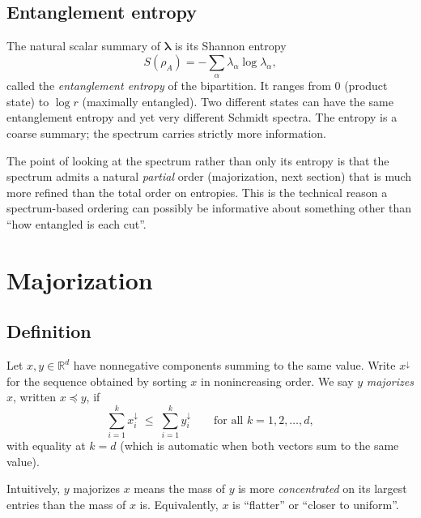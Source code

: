 \documentclass[11pt,a4paper]{article}
\theoremstyle{definition}
\theoremstyle{plain}
\theoremstyle{remark}
\newcommand{\real}{\mathbb{R}}
\begin{document}
\subsection{Entanglement entropy}

The natural scalar summary of $\bm{\lambda}$ is its Shannon entropy
\begin{equation}\label{eq:Sentropy}
  S(\rho_A) = -\sum_\alpha \lambda_\alpha \log \lambda_\alpha,
\end{equation}
called the \emph{entanglement entropy} of the bipartition.  It ranges
from $0$ (product state) to $\log r$ (maximally entangled).  Two
different states can have the same entanglement entropy and yet very
different Schmidt spectra.  The entropy is a coarse summary; the
spectrum carries strictly more information.

The point of looking at the spectrum rather than only its entropy is
that the spectrum admits a natural \emph{partial} order
(majorization, next section) that is much more refined than the
total order on entropies.  This is the technical reason a
spectrum-based ordering can possibly be informative about something
other than ``how entangled is each cut''.

\section{Majorization}\label{sec:majorization}

\subsection{Definition}

Let $x, y \in \real^d$ have nonnegative components summing to the same
value.  Write $x^\downarrow$ for the sequence obtained by sorting $x$
in nonincreasing order.  We say $y$ \emph{majorizes} $x$, written
$x \preceq y$, if
\begin{equation}\label{eq:majdef}
  \sum_{i=1}^{k} x_i^\downarrow
  \;\le\;
  \sum_{i=1}^{k} y_i^\downarrow
  \qquad \text{for all } k = 1, 2, \ldots, d,
\end{equation}
with equality at $k = d$ (which is automatic when both vectors sum to
the same value).

Intuitively, $y$ majorizes $x$ means the mass of $y$ is more
\emph{concentrated} on its largest entries than the mass of $x$ is.
Equivalently, $x$ is ``flatter'' or ``closer to uniform''.
\end{document}
